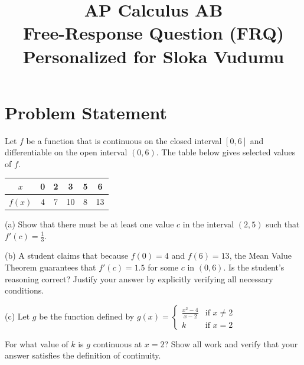 \documentclass[11pt,letterpaper]{article}
\title{\vspace{-2cm}
  \begin{tcolorbox}[colback=alphablue!5!white, colframe=alphablue, width=\textwidth, arc=3mm]
    \begin{center}
      \Large\textbf{\textcolor{alphablue}{AP Calculus AB}} \\
      \large Free-Response Question (FRQ) \\
      \normalsize Personalized for Sloka Vudumu
    \end{center}
  \end{tcolorbox}
  \vspace{-0.5cm}
}
\date{}
\begin{document}
\begin{center}
\end{center}

\maketitle


\section*{\textcolor{alphablue}{Problem Statement}}

\begin{tcolorbox}[colback=white, colframe=alphablue!70, title=\textbf{FRQ Problem}, arc=2mm]
  Let $f$ be a function that is continuous on the closed interval $[0, 6]$ and differentiable on the open interval $(0, 6)$. The table below gives selected values of $f$.

\begin{center}
\begin{tabular}{|c|c|c|c|c|c|}
\hline
$x$ & 0 & 2 & 3 & 5 & 6 \\
\hline
$f(x)$ & 4 & 7 & 10 & 8 & 13 \\
\hline
\end{tabular}
\end{center}

(a) Show that there must be at least one value $c$ in the interval $(2, 5)$ such that $f'(c) = \frac{1}{3}$.

(b) A student claims that because $f(0) = 4$ and $f(6) = 13$, the Mean Value Theorem guarantees that $f'(c) = 1.5$ for some $c$ in $(0, 6)$. Is the student's reasoning correct? Justify your answer by explicitly verifying all necessary conditions.

(c) Let $g$ be the function defined by $g(x) = \begin{cases} \frac{x^2 - 4}{x - 2} & \text{if } x \neq 2 \\ k & \text{if } x = 2 \end{cases}$

For what value of $k$ is $g$ continuous at $x = 2$? Show all work and verify that your answer satisfies the definition of continuity.
\end{tcolorbox}
\end{document}
